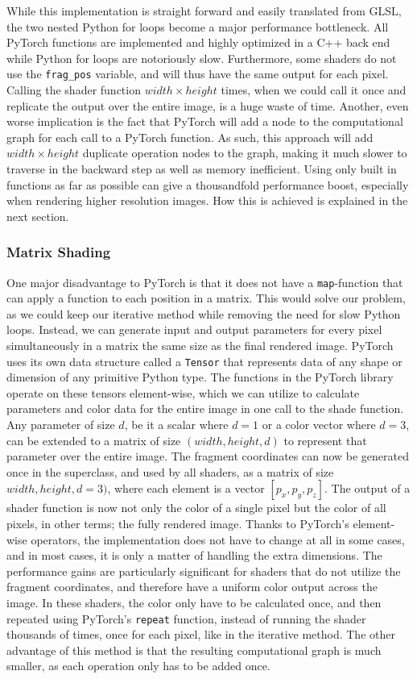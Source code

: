 While this implementation is straight forward and easily translated from GLSL, the two nested Python for loops become a major performance bottleneck. All PyTorch functions are implemented and highly optimized in a C++ back end while Python for loops are notoriously slow. Furthermore, some shaders do not use the \texttt{frag\_pos} variable, and will thus have the same output for each pixel. Calling the shader function $width \times height$ times, when we could call it once and replicate the output over the entire image, is a huge waste of time. Another, even worse implication is the fact that PyTorch will add a node to the computational graph for each call to a PyTorch function. As such, this approach will add $width \times height$ duplicate operation nodes to the graph, making it much slower to traverse in the backward step as well as memory inefficient. Using only built in functions as far as possible can give a thousandfold performance boost, especially when rendering higher resolution images. How this is achieved is explained in the next section.

\subsubsection{Matrix Shading}\label{sec:MethodMatrixImplementation}

One major disadvantage to PyTorch is that it does not have a \texttt{map}-function that can apply a function to each position in a matrix. This would solve our problem, as we could keep our iterative method while removing the need for slow Python loops. Instead, we can generate input and output parameters for every pixel simultaneously in a matrix the same size as the final rendered image. PyTorch uses its own data structure called a \texttt{Tensor} that represents data of any shape or dimension of any primitive Python type. The functions in the PyTorch library operate on these tensors element-wise, which we can utilize to calculate parameters and color data for the entire image in one call to the shade function. Any parameter of size $d$, be it a scalar where $d=1$ or a color vector where $d=3$, can be extended to a matrix of size $(width, height, d)$ to represent that parameter over the entire image. The fragment coordinates can now be generated once in the superclass, and used by all shaders, as a matrix of size $width, height, d=3)$, where each element is a vector $[p_x,  p_y,  p_z]$. The output of a shader function is now not only the color of a single pixel but the color of all pixels, in other terms; the fully rendered image. Thanks to PyTorch's element-wise operators, the implementation does not have to change at all in some cases, and in most cases, it is only a matter of handling the extra dimensions. The performance gains are particularly significant for shaders that do not utilize the fragment coordinates, and therefore have a uniform color output across the image. In these shaders, the color only have to be calculated once, and then repeated using PyTorch's \texttt{repeat} function, instead of running the shader thousands of times, once for each pixel, like in the iterative method. The other advantage of this method is that the resulting computational graph is much smaller, as each operation only has to be added once.


